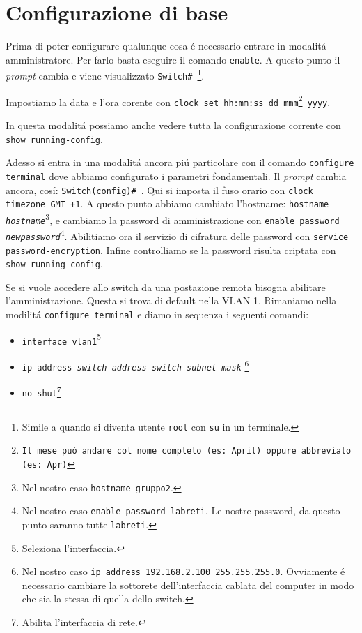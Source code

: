 \documentclass[9pt, a4paper, oneside]{article}
\begin{document}
		\section{Configurazione di base}
			\par
				Prima di poter configurare qualunque cosa \'e 
				necessario entrare in modalit\'a 
				amministratore. Per farlo basta eseguire il 
				comando \texttt{enable}. A questo punto il 
				\emph{prompt} cambia e viene visualizzato 
				\texttt{Switch\# }\footnote{Simile a quando si 
				diventa utente \texttt{root} con \texttt{su} in 
				un terminale.}.
			\par
				Impostiamo la data e l'ora corente con 
				\texttt{clock set hh:mm:ss dd mmm\footnote{Il 
				mese pu\'o andare col nome completo (es: 
				\texttt{April}) oppure abbreviato (es: 
				\texttt{Apr})} yyyy}.
			\par
				In questa modalit\'a possiamo anche vedere 
				tutta la configurazione corrente con 
				\texttt{show running-config}.
			\par
				Adesso si entra in una modalit\'a ancora pi\'u 
				particolare con il comando \texttt{configure 
				terminal} dove abbiamo configurato i parametri 
				fondamentali. Il \emph{prompt} cambia 
				ancora, cos\'i: \texttt{Switch(config)\# }. 
				Qui si imposta il fuso orario con 
				\texttt{clock timezone GMT +1}. A questo punto 
				abbiamo cambiato l'hostname: \texttt{hostname 
				\emph{hostname}}\footnote{Nel nostro caso 
				\texttt{hostname gruppo2}.}, e cambiamo la 
				password di amministrazione con \texttt{enable 
				password \emph{newpassword}}\footnote{Nel 
				nostro caso \texttt{enable password labreti}. 
				Le nostre password, da questo punto saranno 
				tutte \texttt{labreti}.}. Abilitiamo ora il 
				servizio di cifratura delle password con 
				\texttt{service password-encryption}. 
				Infine controlliamo se la password risulta 
				criptata con \texttt{show running-config}.
			\par
				Se si vuole accedere allo switch da una 
				postazione remota bisogna abilitare 
				l'amministrazione. Questa si trova di default 
				nella VLAN 1. Rimaniamo nella modilit\'a 
				\texttt{configure terminal} e diamo in 
				sequenza i seguenti comandi:
				\begin{itemize}
					\item
						\texttt{interface 
						vlan1}\footnote{Seleziona 
						l'interfaccia.}
					\item
						\texttt{ip address 
						\emph{switch-address} 
						\emph{switch-subnet-mask}}
						\footnote{Nel nostro caso 
						\texttt{ip address 
						192.168.2.100 255.255.255.0}. 
						Ovviamente \'e necessario 
						cambiare la sottorete 
						dell'interfaccia cablata del 
						computer in modo che sia la 
						stessa di quella dello 
						switch.}
					\item
						\texttt{no 
						shut}\footnote{Abilita 
						l'interfaccia di rete.}
				\end{itemize}
\end{document}
